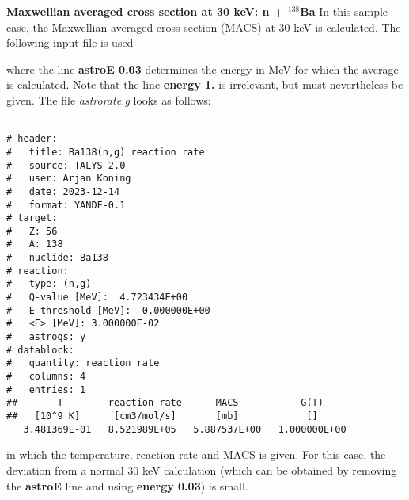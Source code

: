 \begin{samplecase}
{\bf Maxwellian averaged cross section at 30 keV: n + ${}^{138}$Ba}\newline
In this sample case, the Maxwellian averaged cross section (MACS) at 30 keV is calculated.
The following input file is used


where the line {\bf astroE 0.03} determines the energy in MeV for which the
average is calculated. Note that the line {\bf energy 1.} is irrelevant, 
but must nevertheless be given.
The file {\em astrorate.g} looks as follows:
{\small \begin{verbatim}

# header:
#   title: Ba138(n,g) reaction rate
#   source: TALYS-2.0
#   user: Arjan Koning
#   date: 2023-12-14
#   format: YANDF-0.1
# target:
#   Z: 56
#   A: 138
#   nuclide: Ba138
# reaction:
#   type: (n,g)
#   Q-value [MeV]:  4.723434E+00
#   E-threshold [MeV]:  0.000000E+00
#   <E> [MeV]: 3.000000E-02
#   astrogs: y
# datablock:
#   quantity: reaction rate
#   columns: 4
#   entries: 1
##       T        reaction rate      MACS           G(T)
##   [10^9 K]      [cm3/mol/s]       [mb]            []
   3.481369E-01   8.521989E+05   5.887537E+00   1.000000E+00
\end{verbatim} } \renewcommand{\baselinestretch}{1.07}\small\normalsize
\noindent
in which the temperature, reaction rate and MACS is given.
For this case, the deviation from a normal 30 keV calculation (which can be 
obtained by removing the {\bf astroE} line and using {\bf energy 0.03}) is 
small.
\end{samplecase}
